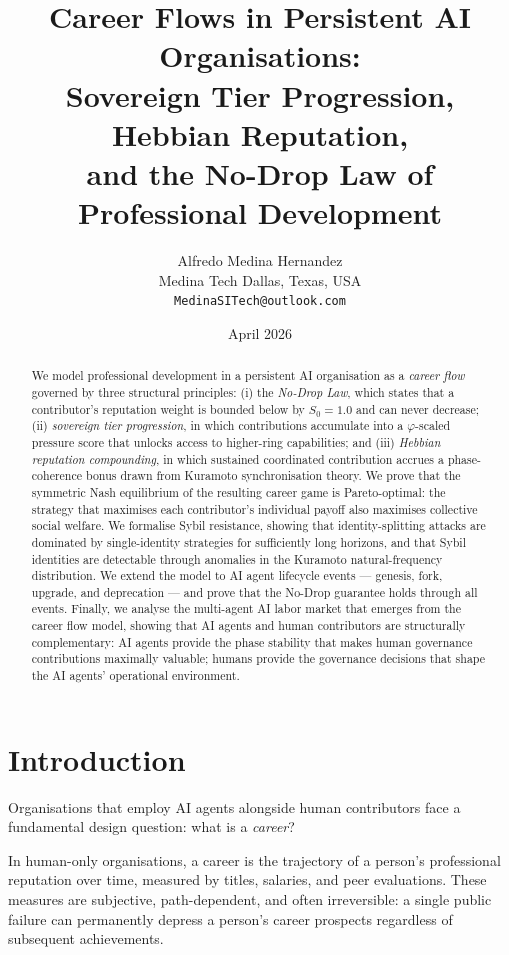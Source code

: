 \documentclass[12pt]{article}
\title{\textbf{Career Flows in Persistent AI Organisations: \\
  Sovereign Tier Progression, Hebbian Reputation, \\
  and the No-Drop Law of Professional Development}}
\author{Alfredo Medina Hernandez \\
  \normalsize Medina Tech \quad Dallas, Texas, USA \\
  \normalsize \texttt{MedinaSITech@outlook.com}}
\date{April 2026}
\newcommand{\PHI}{\varphi}
\begin{document}
\maketitle

\begin{abstract}
We model professional development in a persistent AI organisation as a
\emph{career flow} governed by three structural principles: (i) the
\emph{No-Drop Law}, which states that a contributor's reputation weight is
bounded below by $S_0 = 1.0$ and can never decrease; (ii) \emph{sovereign tier
progression}, in which contributions accumulate into a $\PHI$-scaled pressure
score that unlocks access to higher-ring capabilities; and (iii) \emph{Hebbian
reputation compounding}, in which sustained coordinated contribution accrues a
phase-coherence bonus drawn from Kuramoto synchronisation theory.  We prove
that the symmetric Nash equilibrium of the resulting career game is
Pareto-optimal: the strategy that maximises each contributor's individual payoff
also maximises collective social welfare.  We formalise Sybil resistance,
showing that identity-splitting attacks are dominated by single-identity
strategies for sufficiently long horizons, and that Sybil identities are
detectable through anomalies in the Kuramoto natural-frequency distribution.
We extend the model to AI agent lifecycle events — genesis, fork, upgrade, and
deprecation — and prove that the No-Drop guarantee holds through all events.
Finally, we analyse the multi-agent AI labor market that emerges from the career
flow model, showing that AI agents and human contributors are structurally
complementary: AI agents provide the phase stability that makes human governance
contributions maximally valuable; humans provide the governance decisions that
shape the AI agents' operational environment.
\end{abstract}

\section{Introduction}
\label{sec:intro}

Organisations that employ AI agents alongside human contributors face a
fundamental design question: what is a \emph{career}?

In human-only organisations, a career is the trajectory of a person's
professional reputation over time, measured by titles, salaries, and peer
evaluations.  These measures are subjective, path-dependent, and often
irreversible: a single public failure can permanently depress a person's career
prospects regardless of subsequent achievements.
\end{document}
